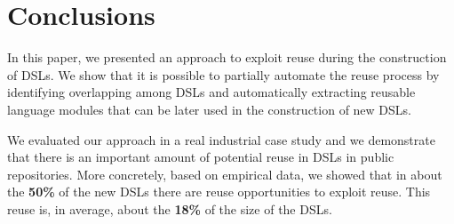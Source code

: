 \section{Conclusions}
\label{sec:conclusions}
In this paper, we presented an approach to exploit reuse during the construction of DSLs. We show that it is possible to partially automate the reuse process by identifying overlapping among DSLs and automatically extracting reusable language modules that can be later used in the construction of new DSLs.

We evaluated our approach in a real industrial case study and we demonstrate that there is an important amount of potential reuse in DSLs in public repositories. More concretely, based on empirical data, we showed that in about the \textbf{50\%} of the new DSLs there are reuse opportunities to exploit reuse. This reuse is, in average, about the \textbf{18\%} of the size of the DSLs. 

